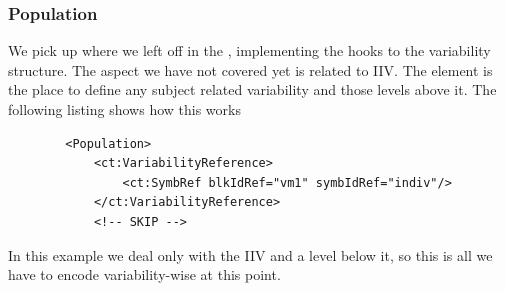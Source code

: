 \subsubsection{Population}
We pick up where we left off in the , implementing
the hooks to the variability structure. The aspect we have not covered
yet is related to IIV.  The  element is the place to
define any subject related variability and those levels above
it. The following listing shows how this works 
\lstset{language=XML}
\begin{lstlisting}
        <Population>
            <ct:VariabilityReference>
                <ct:SymbRef blkIdRef="vm1" symbIdRef="indiv"/>
            </ct:VariabilityReference>
            <!-- SKIP -->
\end{lstlisting}
In this example we deal only with the IIV and a level below it, so this is 
all we have to encode variability-wise at this point.

